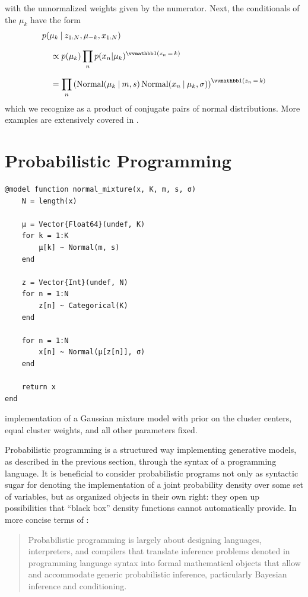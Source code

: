 with the unnormalized weights given by the numerator.  Next, the conditionals of the \(\mu_{k}\)
have the form
\begin{equation}
  \setlength{\jot}{0.8\baselineskip}
  \begin{aligned}
    &p(\mu_{k} \given z_{1:N}, \mu_{-k}, x_{1:N}) \\
    &\quad \propto p(\mu_k) \prod_{n} p(x_{n} | \mu_{k})^{\indicator{z_{n} \, = \, k}} \\
    &\quad = \prod_{n} \left( \Normal(\mu_{k} \given m, s) \,
      \Normal(x_{n} \given \mu_{k}, \sigma) \right)^{\indicator{z_{n} \, = \, k}}
  \end{aligned}
\end{equation}
which we recognize as a product of conjugate pairs of normal distributions.  More examples are
extensively covered in \textcite[chapter 24.2]{murphy2012machine}.

\section{Probabilistic Programming}
\label{sec:prob-prog}

\begin{lstfloat}
  \begin{lstlisting}[style=lstfloat]
@model function normal_mixture(x, K, m, s, σ)
    N = length(x)

    μ = Vector{Float64}(undef, K)
    for k = 1:K
        μ[k] ~ Normal(m, s)
    end

    z = Vector{Int}(undef, N)
    for n = 1:N
        z[n] ~ Categorical(K)
    end

    for n = 1:N
        x[n] ~ Normal(μ[z[n]], σ)
    end

    return x
end
\end{lstlisting}
    \caption{\turingjl{} implementation of a Gaussian mixture model with prior on the cluster centers,
    equal cluster weights, and all other parameters fixed.\label{lst:normal}}
\end{lstfloat}

Probabilistic programming is a structured way implementing generative models, as described in the
previous section, through the syntax of a programming language.  It is beneficial to consider
probabilistic programs not only as syntactic sugar for denoting the implementation of a joint
probability density over some set of variables, but as organized objects in their own right: they
open up possibilities that \enquote{black box} density functions cannot automatically provide. In
more concise terms of \textcite{vandemeent2018introduction}:
\begin{quote}
  Probabilistic programming is largely about designing languages, interpreters, and compilers that
  translate inference problems denoted in programming language syntax into formal mathematical
  objects that allow and accommodate generic probabilistic inference, particularly Bayesian
  inference and conditioning.
\end{quote}

